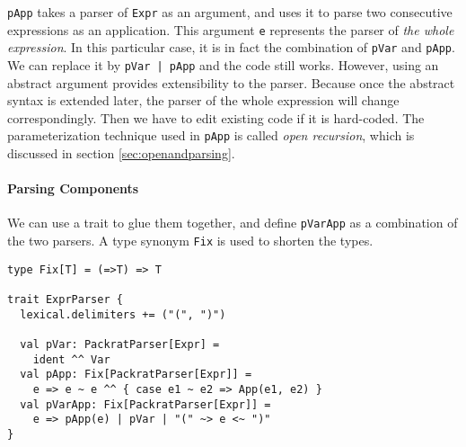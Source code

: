 


\lstinline{pApp} takes a parser of
\lstinline{Expr} as an argument, and uses it to parse two consecutive
expressions as an application. This argument \lstinline{e} represents
the parser of \emph{the whole expression}. In this particular case, it
is in fact the combination of \lstinline{pVar} and
\lstinline{pApp}. We can replace it by \lstinline{pVar | pApp} and the
code still works. However, using an abstract argument provides
extensibility to the parser. Because once the abstract syntax is
extended later, the parser of the whole expression will change
correspondingly. Then we have to edit existing code if it is
hard-coded. The parameterization technique used in \lstinline{pApp} is
called \textit{open recursion}, which is discussed in section
\ref{sec:openandparsing}.

\paragraph{Parsing Components}
We can use a trait to glue them together, and define
\lstinline{pVarApp} as a combination of the two parsers. A type
synonym \lstinline{Fix} is used to shorten the types.

\begin{lstlisting}
type Fix[T] = (=>T) => T

trait ExprParser {
  lexical.delimiters += ("(", ")")

  val pVar: PackratParser[Expr] =
    ident ^^ Var
  val pApp: Fix[PackratParser[Expr]] =
    e => e ~ e ^^ { case e1 ~ e2 => App(e1, e2) }
  val pVarApp: Fix[PackratParser[Expr]] =
    e => pApp(e) | pVar | "(" ~> e <~ ")"
}
\end{lstlisting}

